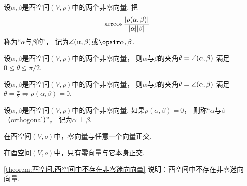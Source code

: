 \begin{definition}
设\(\alpha,\beta\)是酉空间\((V,\rho)\)中的两个非零向量.
把\begin{equation}
	\arccos\frac{\abs{\rho(\alpha,\beta)}}{\abs{\alpha} \abs{\beta}}
\end{equation}
称为“\(\alpha\)与\(\beta\)的”，
记为\(\angle(\alpha,\beta)\)或\(\VectorAngleP{\alpha}{\beta}\).
\end{definition}

\begin{property}
设\(\alpha,\beta\)是酉空间\((V,\rho)\)中的两个非零向量，
则\(\alpha\)与\(\beta\)的夹角\(\theta = \angle(\alpha,\beta)\)
满足\(0 \leq \theta \leq \pi/2\).
\end{property}

\begin{property}
设\(\alpha,\beta\)是酉空间\((V,\rho)\)中的两个非零向量，
则\(\alpha\)与\(\beta\)的夹角\(\theta = \angle(\alpha,\beta)\)
满足\(\theta = \frac\pi2 \iff \rho(\alpha,\beta) = 0\).
\end{property}

\begin{definition}
设\(\alpha,\beta\)是酉空间\((V,\rho)\)中的两个非零向量.
如果\(\rho(\alpha,\beta) = 0\)，
则称“\(\alpha\)与\(\beta\) （orthogonal）”，
记为\(\alpha \perp \beta\).
\end{definition}

\begin{property}
在酉空间\((V,\rho)\)中，零向量与任意一个向量正交.
\end{property}

\begin{property}\label{theorem:酉空间.酉空间中不存在非零迷向向量}
在酉空间\((V,\rho)\)中，只有零向量与它本身正交.
\end{property}
\begin{remark}
\cref{theorem:酉空间.酉空间中不存在非零迷向向量} 说明：酉空间中不存在非零迷向向量.
\end{remark}

